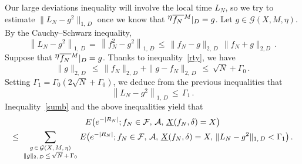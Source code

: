 \documentclass[10pt]{amsart}
\theoremstyle{definition}\newtheorem{defi}[theo]{Definition}\newtheorem{rema}[theo]{Remark}\newtheorem{exam}[theo]{Example}\newtheorem{exem}[theo]{Example}\newtheorem{nota}[theo]{Notation}
\newcommand{\tatop}[2]{\genfrac{}{}{0pt}{1}{#1}{#2}}
\newcommand{\XX}{{\underline{X}}}
\newcommand*\fmne{^{\displaystyle \eta}\overline{f_N\,}^{\lower2pt\hbox{$\scriptstyle M$}}}
\newcommand{\cA}{\mathcal{A}}
\newcommand{\cF}{\mathcal{F}}
\newcommand{\cG}{\mathcal{G}}
\begin{document}
Our large deviations inequality will involve the local time $L_N$, so we try to estimate $\|L_N-g^2\|_{1,\,D}$ once we know that $\fmne|_D=g$. Let $g\in\cG(X,M,\eta)$. By the Cauchy--Schwarz inequality,
\[
\left\|L_N-g^2\right\|_{1,\,D}\,=\,
\left\|f_N^2-g^2\right\|_{1,\,D}\,\leq\, \|f_N-g\|_{2,\,D}\,
\|f_N+g\|_{2,D}\,.
\]
Suppose that $\fmne|_D=g$. Thanks to inequality~\eqref{rty}, we have
\begin{equation}\label{bfg}
\|g\|_{2,\,D}\,\leq\,\|f_N\|_{2,\,D}+ \|g-f_N\|_{2,\,D}\,\leq\,
\sqrt{N}+\Gamma_0\,.
\end{equation}
Setting $\Gamma_1=\Gamma_0(2\sqrt{N}+\Gamma_0)$, we deduce from the previous inequalities that
\begin{equation}\label{cfg}
\left\|L_N-g^2\right\|_{1,\,D}\,\leq\,
\Gamma_1\,.
\end{equation}
Inequality~\eqref{sumb} and the above inequalities yield that
\begin{multline}\label{sumc}
E\big(e^{-|R_N|}; f_N\in\cF,\,\cA,\,\XX(f_N,\delta)=X\big)
\\
\leq\,\sum_{\tatop{g\,\in\,\cG(X,\,M,\,\eta)}{\|g\|_{2,\,D}\,\leq\,\sqrt{N}\,+\,\Gamma_0}} E\big(e^{-|R_N|}; f_N\in\cF,\,\cA,\,\XX(f_N,\delta)=X,
\,\|L_N-g^2\|_{1,\,D}<\Gamma_1
\big)\,.
\end{multline}
\end{document}
